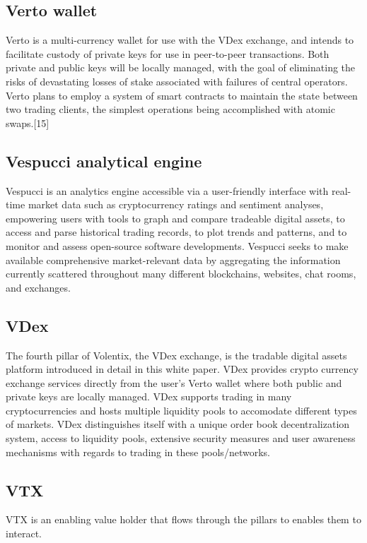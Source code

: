 \documentclass[]{article}
\begin{document}
{\subsection {Verto wallet}

Verto is a multi-currency wallet for use with the VDex exchange, and intends to facilitate custody of private keys for use in peer-to-peer transactions. Both private and public keys will be locally managed, with the goal of eliminating the risks of devastating losses of stake associated with failures of central operators. 
Verto plans to employ a system of smart contracts to maintain the state between two trading clients, the simplest operations being accomplished with atomic swaps.[15]


\subsection {Vespucci analytical engine}

Vespucci is an analytics engine accessible via a user-friendly interface with real-time market data such as cryptocurrency ratings and sentiment analyses, empowering users with tools to graph and compare tradeable digital assets, to access and parse historical trading records, to plot trends and patterns, and to monitor and assess open-source software developments. Vespucci seeks to make available comprehensive market-relevant data by aggregating the information currently scattered throughout many different blockchains, websites, chat rooms, and exchanges. 


\subsection {VDex}

The fourth pillar of Volentix, the VDex exchange, is the tradable digital assets platform introduced in detail in this white paper.
VDex provides crypto currency exchange services directly from the user's Verto wallet where both public and private keys are locally managed.
VDex supports trading in many cryptocurrencies and hosts multiple liquidity pools to accomodate different types of markets.
VDex distinguishes itself with a unique order book decentralization system, access to liquidity pools, extensive security measures and user awareness mechanisms with regards to trading in these pools/networks.


\subsection {VTX}
VTX is an enabling value holder that flows through the pillars to enables them to interact.

}
\end{document}

